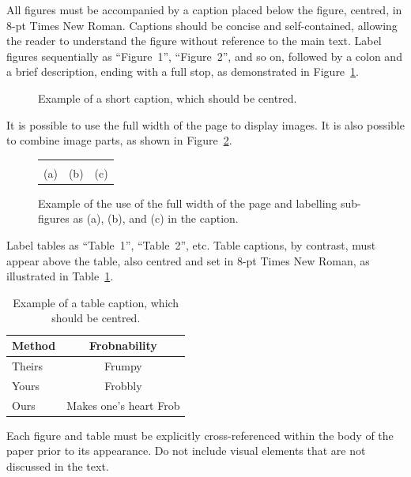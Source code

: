 \documentclass[extendedabs]{recpad2k}
\begin{document}
All figures must be accompanied by a caption placed below the figure, centred, in 8-pt Times New Roman. Captions should be concise and self-contained, allowing the reader to understand the figure without reference to the main text. Label figures sequentially as ``Figure~1'', ``Figure~2'', and so on, followed by a colon and a brief description, ending with a full stop, as demonstrated in Figure~\ref{fig:short}.

\begin{figure}[htpb]
\centering
\fbox{\rule{0pt}{3.0in}\rule{\linewidth}{0pt}}
   \caption{Example of a short caption, which should be centred.}
\label{fig:short}
\end{figure}

It is possible to use the full width of the page to display images. It is also possible to combine image parts, as shown in Figure~\ref{fig:teaser}.

\begin{figure}[htpb]
\centering
\begin{tabular}{ccc}
\fbox{\rule{0pt}{4.2cm}\rule{6.45cm}{0pt}}&
\fbox{\rule{0pt}{4.2cm}\rule{3.83cm}{0pt}}&
\fbox{\rule{0pt}{4.2cm}\rule{6.54cm}{0pt}}\\[2pt]
{\small\color{captionblue}(a)}&{\small\color{captionblue}(b)}&{\small\color{captionblue}(c)}
\end{tabular}
\caption{Example of the use of the full width of the page and labelling
sub-figures as (a), (b), and (c) in the caption.}
\label{fig:teaser}
\end{figure}

Label tables as ``Table~1'', ``Table~2'', etc. Table captions, by contrast, must appear above the table, also centred and set in 8-pt Times New Roman, as illustrated in Table~\ref{tab:example}.

\begin{table}[htpb]
\centering
\caption{Example of a table caption, which should be centred.}
\label{tab:example}
{\renewcommand{\arraystretch}{1.43}%
\begin{tabular}{|l|c|}
\hline
\textbf{Method} & \textbf{Frobnability} \\
\hline
Theirs & Frumpy \\ \hline
Yours  & Frobbly \\ \hline
Ours   & Makes one's heart Frob \\
\hline
\end{tabular}}
\end{table}

Each figure and table must be explicitly cross-referenced within the body of the paper prior to its appearance. Do not include visual elements that are not discussed in the text.
\end{document}
